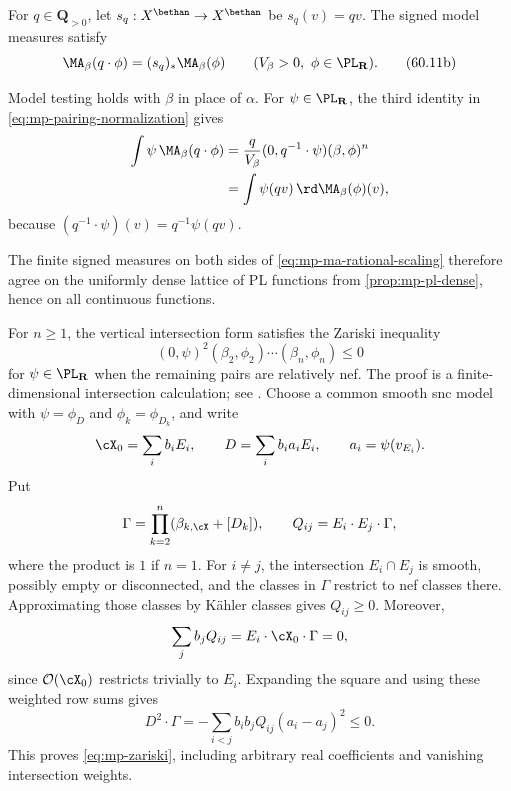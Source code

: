 \noindent\begin{minipage}{\linewidth}
For $q\in\mathbf Q_{>0}$, let $s_q:X^{\bethan}\to X^{\bethan}$ be $s_q(v)=qv$. The signed model measures satisfy
\[
 \MA_\beta(q\cdot\phi)=(s_q)_*\MA_\beta(\phi)
 \qquad (V_\beta>0,\ \phi\in\PL_{\mathbf R}).
\tag{60.11b}\label{eq:mp-ma-rational-scaling}
\]
\end{minipage}\par\smallskip
\noindent\begin{minipage}{\linewidth}
Model testing holds with $\beta$ in place of $\alpha$. For $\psi\in\PL_{\mathbf R}$, the third identity in \eqref{eq:mp-pairing-normalization} gives
\[
 \begin{aligned}
 \int\psi\,\MA_\beta(q\cdot\phi)
 &=\frac{q}{V_\beta}(0,q^{-1}\cdot\psi)(\beta,\phi)^n\\
 &=\int\psi(qv)\,\rd\MA_\beta(\phi)(v),
 \end{aligned}
\]
because $(q^{-1}\cdot\psi)(v)=q^{-1}\psi(qv)$.
\end{minipage}\par\smallskip
The finite signed measures on both sides of \eqref{eq:mp-ma-rational-scaling} therefore agree on the uniformly dense lattice of PL functions from \cref{prop:mp-pl-dense}, hence on all continuous functions.

For $n\geq1$, the vertical intersection form satisfies the Zariski inequality
\[
             (0,\psi)^2(\beta_2,\phi_2)\cdots(\beta_n,\phi_n)\leq0
\tag{60.12}\label{eq:mp-zariski}
\]
for $\psi\in\PL_{\mathbf R}$ when the remaining pairs are relatively
nef.  The proof is a finite-dimensional intersection calculation;
see \cite[Lemma~4.2.6, p.~38]{MPTropicalV2}.
Choose a common smooth snc model with $\psi=\phi_D$ and
$\phi_k=\phi_{D_k}$, and write
\[
 \cX_0=\sum_i b_iE_i,\qquad
 D=\sum_i b_i a_iE_i,\qquad a_i=\psi(v_{E_i}).
\]
Put
\[
 \Gamma=\prod_{k=2}^n(\beta_{k,\cX}+[D_k]),\qquad
 Q_{ij}=E_i\cdot E_j\cdot\Gamma,
\]
where the product is $1$ if $n=1$.  For $i\ne j$, the intersection
$E_i\cap E_j$ is smooth, possibly empty or disconnected, and the
classes in $\Gamma$ restrict to nef classes there.  Approximating those classes
by K\"ahler classes gives $Q_{ij}\geq0$.  Moreover,
\[
 \sum_j b_jQ_{ij}=E_i\cdot\cX_0\cdot\Gamma=0,
\]
since $\mathcal O(\cX_0)$ restricts trivially to $E_i$.
Expanding the square and using these weighted row sums gives
\[
 D^2\cdot\Gamma
 =-\sum_{i<j}b_i b_jQ_{ij}(a_i-a_j)^2\leq0.
\tag{60.12a}\label{eq:mp-zariski-weighted-graph}
\]
This proves \eqref{eq:mp-zariski}, including arbitrary real coefficients
and vanishing intersection weights.

